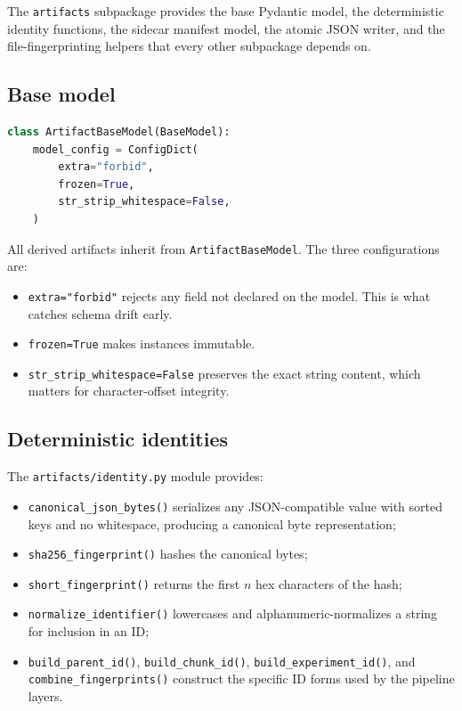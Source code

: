\documentclass[11pt,a4paper]{article}
\begin{document}
The \texttt{artifacts} subpackage provides the base Pydantic model,
the deterministic identity functions, the sidecar manifest model,
the atomic JSON writer, and the file-fingerprinting helpers that
every other subpackage depends on.

\subsection{Base model}
\begin{lstlisting}[language=python]
class ArtifactBaseModel(BaseModel):
    model_config = ConfigDict(
        extra="forbid",
        frozen=True,
        str_strip_whitespace=False,
    )
\end{lstlisting}

All derived artifacts inherit from \texttt{ArtifactBaseModel}. The
three configurations are:

\begin{itemize}[leftmargin=1.5em,itemsep=0.15em]
  \item \texttt{extra="forbid"} rejects any field not declared on the
    model. This is what catches schema drift early.
  \item \texttt{frozen=True} makes instances immutable.
  \item \texttt{str\_strip\_whitespace=False} preserves the exact
    string content, which matters for character-offset integrity.
\end{itemize}

\subsection{Deterministic identities}
The \texttt{artifacts/identity.py} module provides:

\begin{itemize}[leftmargin=1.5em,itemsep=0.15em]
  \item \texttt{canonical\_json\_bytes()} serializes any
    JSON-compatible value with sorted keys and no whitespace,
    producing a canonical byte representation;
  \item \texttt{sha256\_fingerprint()} hashes the canonical bytes;
  \item \texttt{short\_fingerprint()} returns the first $n$
    hex characters of the hash;
  \item \texttt{normalize\_identifier()} lowercases and
    alphanumeric-normalizes a string for inclusion in an ID;
  \item \texttt{build\_parent\_id()}, \texttt{build\_chunk\_id()},
    \texttt{build\_experiment\_id()}, and
    \texttt{combine\_fingerprints()} construct the specific ID forms
    used by the pipeline layers.
\end{itemize}
\end{document}
